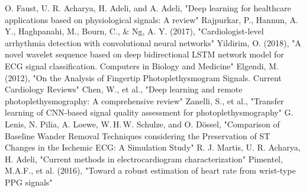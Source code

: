 \documentclass[journal]{IEEEtran}
\begin{document}
\newpage
\begin{thebibliography}{1}
 O. Faust, U. R. Acharya, H. Adeli, and A. Adeli, "Deep learning for healthcare applications based on physiological signals: A review"
 Rajpurkar, P., Hannun, A. Y., Haghpanahi, M., Bourn, C., \& Ng, A. Y. (2017), "Cardiologist-level arrhythmia detection with convolutional neural networks"
 Yildirim, O. (2018), "A novel wavelet sequence based on deep bidirectional LSTM network model for ECG signal classification. Computers in Biology and Medicine"
 Elgendi, M. (2012), "On the Analysis of Fingertip Photoplethysmogram Signals. Current Cardiology Reviews"
Chen, W., et al., "Deep learning and remote photoplethysmography: A comprehensive review" 
Zanelli, S., et al., "Transfer learning of CNN-based signal quality assessment for photoplethysmography"
 G. Lenis, N. Pilia, A. Loewe, W. H. W. Schulze, and O. Dössel, "Comparison of Baseline Wander Removal Techniques considering the Preservation of ST Changes in the Ischemic ECG: A Simulation Study"
 R. J. Martis, U. R. Acharya, H. Adeli, "Current methods in electrocardiogram characterization"
 Pimentel, M.A.F., et al. (2016), "Toward a robust estimation of heart rate from wrist-type PPG signals"

\end{thebibliography}
\end{document}
